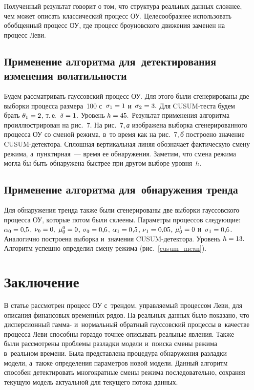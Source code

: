 \begin{multicols}{2}

        Полученный результат говорит о том, что структура реальных данных 
сложнее, чем может описать классический процесс ОУ. 
Целесообразнее использовать обобщенный процесс ОУ, где процесс 
броуновского движения заменен на процесс Леви.

        \subsection{Применение алгоритма для~детектирования изменения 
волатильности}

       Будем рассматривать гауссовский процесс ОУ. Для этого 
были сгенерированы две выборки процесса размера~100 с~$\sigma_1\hm=1$ и~$\sigma_2\hm=3.$ 
Для CUSUM-тес\-та будем брать $\theta_1\hm=2$, т.\,е.\ $\delta\hm=1$. Уровень $h\hm=45.$ 
Результат применения алгоритма проиллюстрирован на рис.~7. На 
рис.~7,\,\textit{а} изображена выборка сгенерированного процесса ОУ со сменой 
режима, в~то время как на рис.~7,\,\textit{б} построено значение CUSUM-де\-тек\-то\-ра. Сплошная 
вертикальная линяя обозначает фактическую смену режима, а~пунктирная~--- время ее 
обнаружения. Заметим, что смена режима могла бы быть обнаружена быстрее при 
другом выборе уровня~$h$.

        \subsection{Применение алгоритма для~обнаружения тренда}

        Для обнаружения тренда также были сгенерированы две выборки гауссовского 
процесса ОУ, которые потом были склеены. Параметры процессов 
следующие: $\alpha_0\hm=0{,}5$, $\nu_0\hm=0$, $\mu_0^0\hm=0$, 
$\sigma_0\hm=0{,}6$, $\alpha_1\hm=0{,}5$, 
$\nu_1\hm=0{,}05$, $\mu_0^1\hm=0$ и~$\sigma_1\hm=0{,}6$. 
Аналогично построена выборка и~значения 
CUSUM-де\-тек\-то\-ра. Уровень $h\hm=13.$ Алгоритм успешно определил смену режима 
(рис.~\ref{cusum_mean}).
       



\section {Заключение}

В статье рассмотрен процесс ОУ с~трендом, управ\-ля\-емый процессом 
Леви, для описания финансовых временн$\acute{\mbox{ы}}$х рядов.
На реальных данных было показано, что дисперсионный гамма- и~нормальный обратный 
гауссовский процессы в~качестве процесса Леви способны гораздо точнее описывать 
реальные явления. Также были рас\-смот\-ре\-ны проб\-ле\-мы разладки модели и~поиска смены 
режима в~реальном времени. Была представлена процедура обнаружения разладки 
модели, а~также определения параметров новой модели. Данный алгоритм способен 
детектировать многократные смены режима последовательно, сохраняя текущую модель 
актуальной для текущего потока данных.


\end{multicols}

